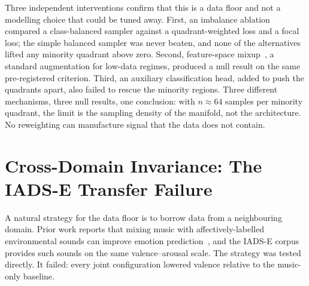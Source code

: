\documentclass[12pt]{report}
\begin{document}
Three independent interventions confirm that this is a data floor and not a modelling choice that could be tuned away. First, an imbalance ablation compared a class-balanced sampler against a quadrant-weighted loss and a focal loss; the simple balanced sampler was never beaten, and none of the alternatives lifted any minority quadrant above zero. Second, feature-space mixup~\cite{zhang_mixup_2018}, a standard augmentation for low-data regimes, produced a null result on the same pre-registered criterion. Third, an auxiliary classification head, added to push the quadrants apart, also failed to rescue the minority regions. Three different mechanisms, three null results, one conclusion: with $n\approx64$ samples per minority quadrant, the limit is the sampling density of the manifold, not the architecture. No reweighting can manufacture signal that the data does not contain.

\section{Cross-Domain Invariance: The IADS-E Transfer Failure}
\label{sec:results-iadse}

A natural strategy for the data floor is to borrow data from a neighbouring domain. Prior work reports that mixing music with affectively-labelled environmental sounds can improve emotion prediction~\cite{simonetta_joint_2024}, and the IADS-E corpus~\cite{yang_affective_2018} provides such sounds on the same valence--arousal scale. The strategy was tested directly. It failed: every joint configuration lowered valence relative to the music-only baseline.
\end{document}
